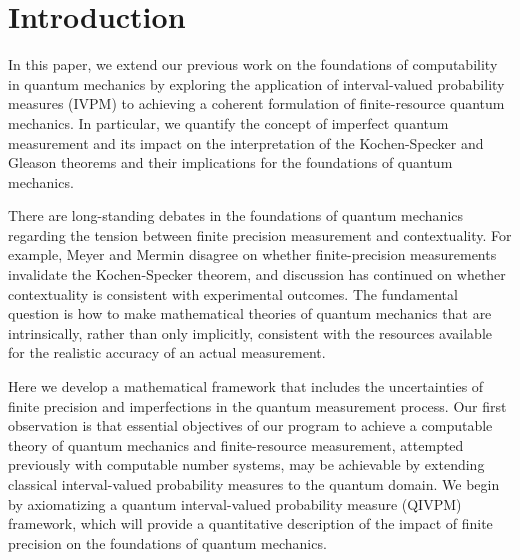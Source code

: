 \documentclass[english,reprint, aps, prl,superscriptaddress, showpacs,
showkeys, longbibliography, amsmath, amssymb]{revtex4-1}
\theoremstyle{plain}
\theoremstyle{definition}
\newcommand{\nb}{\nolinebreak[1] }
\begin{document}
\maketitle

\section{Introduction}

In this paper, we extend our previous work on the foundations of
computability in quantum mechanics by exploring the application of
interval-valued probability measures (IVPM) to achieving a coherent
formulation of finite-resource quantum mechanics.  In particular, we quantify the concept of imperfect quantum measurement and its impact on the interpretation of the Kochen-Specker and Gleason theorems and their implications for the foundations of quantum mechanics. 

There are long-standing debates in the foundations of quantum
mechanics regarding the tension between finite precision measurement
and contextuality\nb\cite{BarrettKent2004,Appleby_2005}.  For example,
Meyer\nb\cite{PhysRevLett.83.3751} and Mermin\nb\cite{Mermin1999} disagree
on whether finite-precision measurements invalidate the Kochen-Specker
theorem\nb\cite{kochenspecker1967,peres1995quantum}, and discussion
has continued on whether contextuality is consistent with  experimental outcomes\nb\cite{Spekkens2005,GuehneKleinmannCabelloEtAl2010,MazurekPuseyKunjwalEtAl2016}. The
fundamental question is how to make mathematical theories of quantum mechanics that are intrinsically, rather than only implicitly, consistent with the resources available for the realistic accuracy of an actual measurement.

Here we develop a mathematical framework that includes the uncertainties of finite precision and imperfections in the quantum measurement process.  Our first observation is that essential objectives of our program to
achieve a computable theory of quantum mechanics and finite-resource
measurement, attempted previously with computable number
systems\nb\cite{usat,geometry2013apsrev4,DQT2014}, may be achievable by
extending classical interval-valued probability
measures\nb\cite{JamisonLodwick2004} to the quantum domain.  We begin by axiomatizing a quantum interval-valued probability measure (QIVPM) framework, which will provide a quantitative description of the impact of finite precision on the foundations of quantum mechanics.
\end{document}
